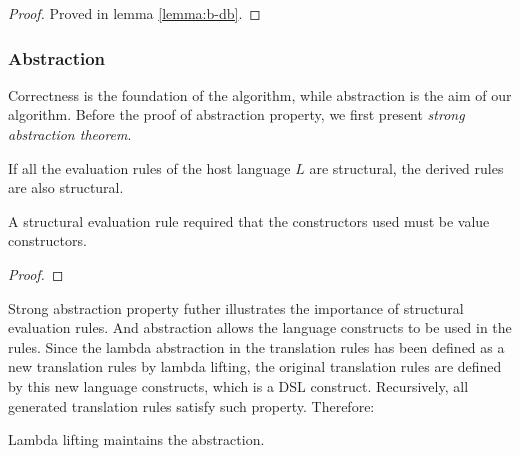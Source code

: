 \begin{proof}
  Proved in lemma \ref{lemma:b-db}.
\end{proof}

\subsubsection{Abstraction}

Correctness is the foundation of the algorithm,
 while abstraction is the aim of our algorithm.
Before the proof of abstraction property,
 we first present \textit{strong abstraction theorem}.


\begin{theorem}
  If all the evaluation rules of the host language $L$ are structural,
  the derived rules are also structural.
\end{theorem}

A structural evaluation rule required that the constructors used must be value constructors.

\begin{proof}
  
\end{proof}

Strong abstraction property futher illustrates the importance of structural evaluation rules.
And abstraction allows the language constructs to be used in the rules.
Since the lambda abstraction in the translation rules has been defined as a new translation rules by lambda lifting, 
 the original translation rules are defined by this new language constructs, which is a DSL construct.
Recursively, all generated translation rules satisfy such property.
Therefore:

\begin{theorem}
  Lambda lifting maintains the abstraction.
\end{theorem}





